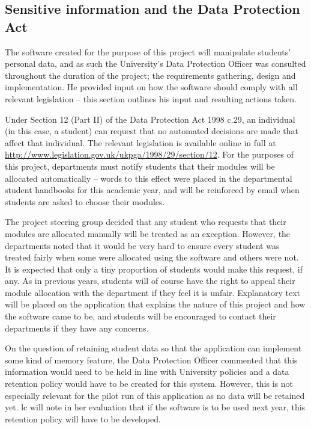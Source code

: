 
\subsection{Sensitive information and the Data Protection Act}
\label{sec:dataprotection}


The software created for the purpose of this project will manipulate students'
personal data, and as such the University's Data Protection Officer was
consulted throughout the duration of the project; the requirements gathering,
design and implementation. He provided input on how the software should comply
with all relevant legislation -- this section outlines his input and resulting
actions taken.

\mynobreakpar

Under Section 12 (Part II) of the Data Protection Act 1998 c.29, an individual
(in this case, a student) can request that no automated decisions are made
that affect that individual. The relevant legislation is available online in
full at \url{http://www.legislation.gov.uk/ukpga/1998/29/section/12}. For the
purposes of this project, departments must notify students that their modules
will be allocated automatically -- words to this effect were placed in the
departmental student handbooks for this academic year, and will be reinforced
by email when students are asked to choose their modules.

The project steering group decided that any student who requests that their
modules are allocated manually will be treated as an exception. However, the
departments noted that it would be very hard to ensure every student was
treated fairly when some were allocated using the software and others were
not. It is expected that only a tiny proportion of students would make this
request, if any. As in previous years, students will of course have the right
to appeal their module allocation with the department if they feel it is
unfair. Explanatory text will be placed on the application that explains the
nature of this project and how the software came to be, and students will be
encouraged to contact their departments if they have any concerns.

\mynobreakpar

On the question of retaining student data so that the application can
implement some kind of memory feature, the Data Protection Officer commented
that this information would need to be held in line with University policies
and a data retention policy would have to be created for this system. However,
this is not especially relevant for the pilot run of this application as no
data will be retained yet. \gls{lc} will note in her evaluation that if the
software is to be used next year, this retention policy will have to be
developed.

